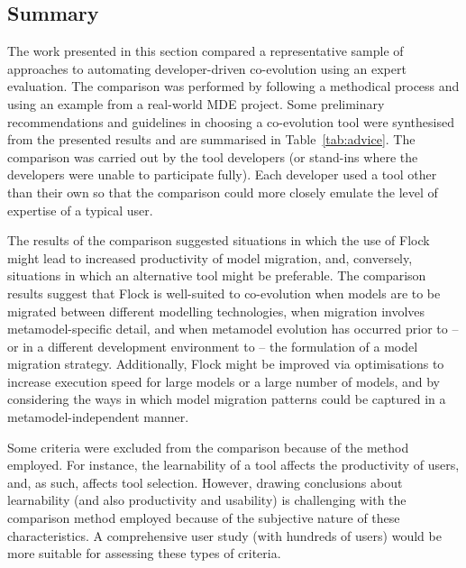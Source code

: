\subsection{Summary}
The work presented in this section compared a representative sample of approaches to automating developer-driven co-evolution using an expert evaluation. The comparison was performed by following a methodical process and using an example from a real-world MDE project. Some preliminary recommendations and guidelines in choosing a co-evolution tool were synthesised from the presented results and are summarised in Table~\ref{tab:advice}. The comparison was carried out by the tool developers (or stand-ins where the developers were unable to participate fully). Each developer used a tool other than their own so that the comparison could more closely emulate the level of expertise of a typical user.

The results of the comparison suggested situations in which the use of Flock might lead to increased productivity of model migration, and, conversely, situations in which an alternative tool might be preferable. The comparison results suggest that Flock is well-suited to co-evolution when models are to be migrated between different modelling technologies, when migration involves metamodel-specific detail, and when metamodel evolution has occurred prior to -- or in a different development environment to -- the formulation of a model migration strategy. Additionally, Flock might be improved via optimisations to increase execution speed for large models or a large number of models, and by considering the ways in which model migration patterns could be captured in a metamodel-independent manner.

Some criteria were excluded from the comparison because of the method employed. For instance, the learnability of a tool affects the productivity of users, and, as such, affects tool selection. However, drawing conclusions about learnability (and also productivity and usability) is challenging with the comparison method employed because of the subjective nature of these characteristics. A comprehensive user study (with hundreds of users) would be more suitable for assessing these types of criteria.
